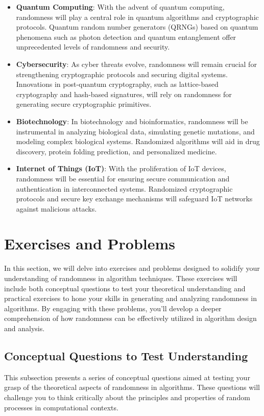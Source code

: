 \documentclass[12pt]{book} %
\begin{document}
\begin{itemize}
    \item \textbf{Quantum Computing}: With the advent of quantum computing, randomness will play a central role in quantum algorithms and cryptographic protocols. Quantum random number generators (QRNGs) based on quantum phenomena such as photon detection and quantum entanglement offer unprecedented levels of randomness and security.
    
    \item \textbf{Cybersecurity}: As cyber threats evolve, randomness will remain crucial for strengthening cryptographic protocols and securing digital systems. Innovations in post-quantum cryptography, such as lattice-based cryptography and hash-based signatures, will rely on randomness for generating secure cryptographic primitives.
    
    \item \textbf{Biotechnology}: In biotechnology and bioinformatics, randomness will be instrumental in analyzing biological data, simulating genetic mutations, and modeling complex biological systems. Randomized algorithms will aid in drug discovery, protein folding prediction, and personalized medicine.
    
    \item \textbf{Internet of Things (IoT)}: With the proliferation of IoT devices, randomness will be essential for ensuring secure communication and authentication in interconnected systems. Randomized cryptographic protocols and secure key exchange mechanisms will safeguard IoT networks against malicious attacks.
\end{itemize}

\section{Exercises and Problems}
In this section, we will delve into exercises and problems designed to solidify your understanding of randomness in algorithm techniques. These exercises will include both conceptual questions to test your theoretical understanding and practical exercises to hone your skills in generating and analyzing randomness in algorithms. By engaging with these problems, you'll develop a deeper comprehension of how randomness can be effectively utilized in algorithm design and analysis.

\subsection{Conceptual Questions to Test Understanding}
This subsection presents a series of conceptual questions aimed at testing your grasp of the theoretical aspects of randomness in algorithms. These questions will challenge you to think critically about the principles and properties of random processes in computational contexts.
\end{document}
